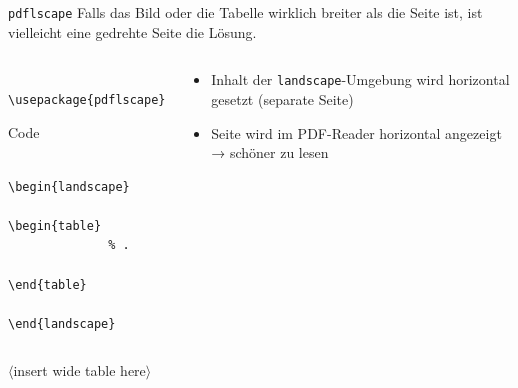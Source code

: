 \begin{frame}[fragile]{\texttt{pdflscape}}
  Falls das Bild oder die Tabelle wirklich breiter als die Seite ist, ist vielleicht eine gedrehte Seite die Lösung.
  \begin{columns}[onlytextwidth, t]
    \begin{column}{0.50\textwidth}
      \begin{Packages}
        \begin{lstlisting}
          \usepackage{pdflscape}
        \end{lstlisting}
      \end{Packages}
      \begin{block}{Code}
        \begin{lstlisting}
          \begin{landscape}
            \begin{table}
              % .
            \end{table}
          \end{landscape}
        \end{lstlisting}
      \end{block}
    \end{column}
    \begin{column}{0.46\textwidth}
      \begin{itemize}
        \item Inhalt der \texttt{landscape}-Umgebung wird horizontal gesetzt (separate Seite)
        \item Seite wird im PDF-Reader horizontal angezeigt → schöner zu lesen
      \end{itemize}
    \end{column}
  \end{columns}
\end{frame}

\begin{landscape}
  \begin{frame}
    \centering
    $\langle$insert wide table here$\rangle$
  \end{frame}
\end{landscape}
